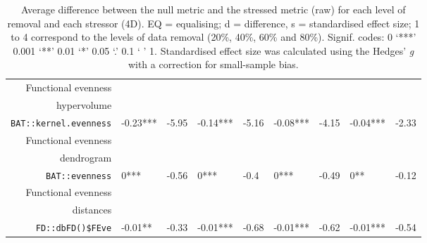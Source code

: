 \begin{table}[ht]
\begin{tabular}{rllllllll}
  Functional evenness\\ hypervolume\\ \texttt{BAT::kernel.evenness} & -0.23*** & -5.95 & -0.14*** & -5.16 & -0.08*** & -4.15 & -0.04*** & -2.33 \\ 
  Functional evenness\\ dendrogram\\ \texttt{BAT::evenness} & 0*** & -0.56 & 0*** & -0.4 & 0*** & -0.49 & 0** & -0.12 \\ 
  Functional evenness\\ distances\\ \texttt{FD::dbFD()\$FEve} & -0.01** & -0.33 & -0.01*** & -0.68 & -0.01*** & -0.62 & -0.01*** & -0.54 \\ 
   \hline
\end{tabular}
\caption{Average difference between the null metric and the stressed metric (raw) for each level of removal and each stressor (4D). EQ = equalising; d = difference, s = standardised effect size; 1 to 4 correspond to the levels of data removal (20\%, 40\%, 60\% and 80\%). Signif. codes:  0 ‘***’ 0.001 ‘**’ 0.01 ‘*’ 0.05 ‘.’ 0.1 ‘ ’ 1. Standardised effect size was calculated using the Hedges' \textit{g} with a correction for small-sample bias.} 
\end{table}
